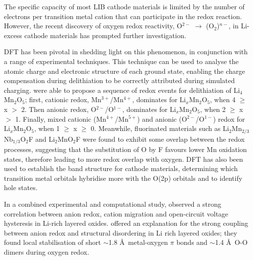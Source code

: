 \documentclass[../main.tex]{subfiles}
\begin{document}
The specific capacity of most LIB cathode materials is limited by the number of electrons per transition metal cation that can participate in the redox reaction. However, the recent discovery of oxygen redox reactivity, O$^{2-}$ $\to$ (O$_2$)$^{n-}$,  in Li-excess cathode materials\cite{Koga2013, Sathiya2013, Oishi2015, Sathiya2015, McCalla2015, Cao2015, Shimoda2016, Chen2016, Luo2016a, Hy2016, Muhammad2016, Seo2016, Gent2017, Zhan2017,  Zheng2017,Assat2018, BenYahia2019, naylor2019depth, Hua2019, House2020, Li2019, Eum2020, Gent2020, Sharpe2020} has prompted further investigation.

DFT has been pivotal in shedding light on this phenomenon, in conjunction with a range of experimental techniques. This technique can be used to analyse the atomic charge and electronic structure of each ground state, enabling the charge compensation during delithiation to be correctly attributed during simulated charging. \citeauthor{Yao2018} were able to propose a sequence of redox events for delithiation of Li$_4$Mn$_2$O$_5$;\cite{Yao2018} first, cationic redox, Mn$^{3+}$/Mn$^{4+}$, dominates for Li$_x$Mn$_2$O$_5$, when 4 $\geq$ x $>$ 2. Then anionic redox, O$^{2-}$/O$^{1-}$, dominates for Li$_x$Mn$_2$O$_5$, when 2 $\geq$ x $>$ 1. Finally, mixed cationic (Mn$^{4+}$/Mn$^{5+}$) and anionic (O$^{2-}$/O$^{1-}$) redox for Li$_x$Mn$_2$O$_5$, when 1 $\geq$ x $\geq$ 0. Meanwhile, fluorinated materials such as Li$_2$Mn$_{2/3}$Nb$_{1/3}$O$_2$F\cite{Lee2018} and Li$_2$MnO$_2$F\cite{Sharpe2020} were found to exhibit some overlap between the redox processes, suggesting that the substitution of O by F favours lower Mn oxidation states, therefore leading to more redox overlap with oxygen. DFT has also been used to establish the band structure for cathode materials, determining which transition metal orbitals hybridise more with the O(2p) orbitals\cite{Cao2015, Sathiya2013a} and to identify hole states.\cite{Zhan2017, Xiao2012}

In a combined experimental and computational study, \citeauthor{Gent2017} observed a strong correlation between anion redox, cation migration and open-circuit voltage hysteresis in Li-rich layered oxides.\cite{Gent2017} \citeauthor{Hong2019} offered an explanation for the strong coupling between anion redox and structural disordering in Li rich layered oxides; they found local stabilisation of short $\sim$1.8 \AA \ metal-oxygen $\pi$ bonds and $\sim$1.4 \AA \ O-O dimers during oxygen redox.\cite{Hong2019}
\end{document}
